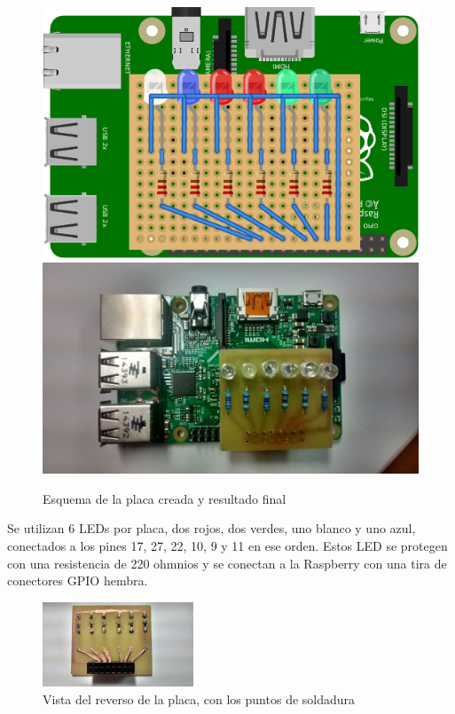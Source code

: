 \documentclass{article}
\begin{document}
\begin{figure}[H]
\centering
\includegraphics[height=0.2\textheight]{placabreadboard_bb}
\includegraphics[height=0.2\textheight]{led/general}
\caption{Esquema de la placa creada y resultado final}
\end{figure}

Se utilizan 6 LEDs por placa, dos rojos, dos verdes, uno blanco y uno azul, conectados a los pines 17, 27, 22, 10, 9 y 11 en ese orden. Estos LED se protegen con una resistencia de 220 ohmnios y se conectan a la Raspberry con una tira de conectores GPIO hembra.

\begin{figure}[H]
\centering
\includegraphics[width=0.4\textwidth]{led/placareverso}
\caption{Vista del reverso de la placa, con los puntos de soldadura}
\end{figure}
\end{document}
